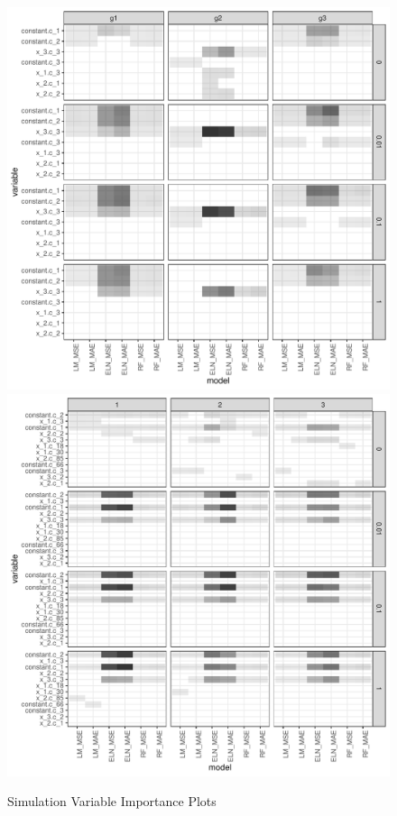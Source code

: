 \documentclass[a4paper, table]{article}
\begin{document}
\begin{figure}
	\caption{Simulation Variable Importance Plots}
	\begin{center}
		\includegraphics{simulation_ave_vi_plot.pdf}
		\includegraphics{simulation_g1_vi_plot.pdf}

\end{center}
\end{figure}
\end{document}
